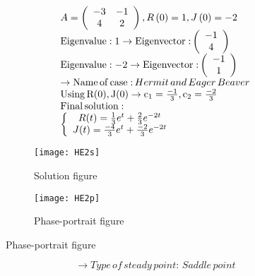 \documentclass[a4paper]{article}
\begin{document}
\[\begin{array}{l}
A = \left( {\begin{array}{*{20}{c}}
{ - 3}&{ - 1}\\
4&2
\end{array}} \right),R\left( 0 \right) = 1,J\left( 0 \right) =  - 2\\
{\rm{Eigenvalue:1}} \to {\rm{Eigenvector:}}\left( {\begin{array}{*{20}{c}}
{ - 1}\\
4
\end{array}} \right)\\
{\rm{Eigenvalue: - 2}} \to {\rm{Eigenvector:}}\left( {\begin{array}{*{20}{c}}
{ - 1}\\
1
\end{array}} \right)\\
 \to {\rm{Name}}\,{\rm{of}}\,{\rm{case:}}\,Hermit\,and\,Eager\,Beaver\\
{\rm{Using}}\,{\rm{R(0), J(0)}} \to {{\rm{c}}_1} = \frac{{ - 1}}{3},{\rm{ }}{{\rm{c}}_2} = \frac{{ - 2}}{3}\\
{\rm{Final}}\,{\rm{solution:}}\\
\left\{ {\begin{array}{*{20}{c}}
{R(t) = \frac{1}{3}{e^t} + \frac{2}{3}{e^{ - 2t}}}\\
{J(t) = \frac{{ - 4}}{3}{e^t} + \frac{{ - 2}}{3}{e^{ - 2t}}}
\end{array}} \right.
\end{array}\]
\begin{figure}[H]
\centering
\begin{subfigure}{.5\textwidth}
  \centering
  \texttt{[image: HE2s]}
  \caption*{Solution figure}
\end{subfigure}%
\begin{subfigure}{.5\textwidth}
  \centering
  \texttt{[image: HE2p]}
  \caption*{Phase-portrait figure}
\end{subfigure}
\end{figure}
\[  \to  Type\,of\,steady\,point:\,Saddle\,point\]
\end{document}

